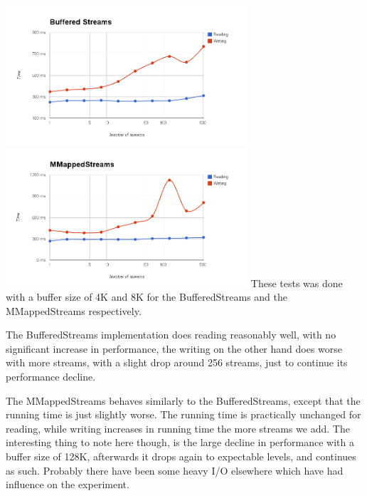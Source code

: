 \includegraphics[width=90mm]{graphics/BS.png}
\includegraphics[width=90mm]{graphics/MMS.png}
These tests was done with a buffer size of 4K and 8K for the BufferedStreams and the MMappedStreams respectively.

The BufferedStreams implementation does reading reasonably well, with no significant increase in performance, the writing on the other hand does worse with more streams, with a slight drop around 256 streams, just to continue its performance decline. 

The MMappedStreams behaves similarly to the BufferedStreams, except that the running time is just slightly worse. The running time is practically unchanged for reading, while writing increases in running time the more streams we add. The interesting thing to note here though, is the large decline in performance with a buffer size of 128K, afterwards it drops again to expectable levels, and continues as such. Probably there have been some heavy I/O elsewhere which have had influence on the experiment. 

